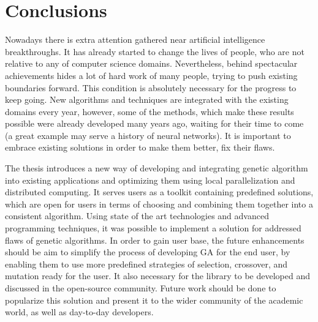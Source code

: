 \chapter*{Conclusions}

Nowadays there is extra attention gathered near artificial intelligence breakthroughs. It has already started to change the lives of people, who are not relative to any of computer science domains. Nevertheless, behind spectacular achievements hides a lot of hard work of many people, trying to push existing boundaries forward. This condition is absolutely necessary for the progress to keep going. New algorithms and techniques are integrated with the existing domains every year, however, some of the methods, which make these results possible were already developed many years ago, waiting for their time to come (a great example may serve a history of neural networks). It is important to embrace existing solutions in order to make them better, fix their flaws.

The thesis introduces a new way of developing and integrating genetic algorithm into existing applications and optimizing them using local parallelization and distributed computing. It serves users as a toolkit containing predefined solutions, which are open for users in terms of choosing and combining them together into a consistent algorithm. Using state of the art technologies and advanced programming techniques, it was possible to implement a solution for addressed flaws of genetic algorithms. In order to gain user base, the future enhancements should be aim to simplify the process of developing GA for the end user, by enabling them to use more predefined strategies of selection, crossover, and mutation ready for the user. It also necessary for the library to be developed and discussed in the open-source community. Future work should be done to popularize this solution and present it to the wider community of the academic world, as well as day-to-day developers.